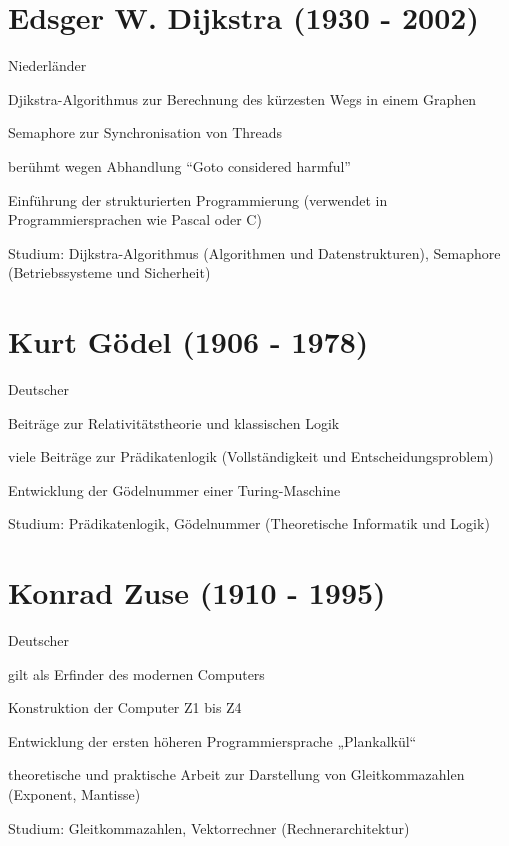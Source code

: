 \documentclass[a4paper,12pt]{report}
\begin{document}
\section*{Edsger W. Dijkstra (1930 - 2002)}
\begin{itemize*}
	\item Niederländer
	\item Djikstra-Algorithmus zur Berechnung des kürzesten Wegs in einem Graphen
	\item Semaphore zur Synchronisation von Threads
	\item berühmt wegen Abhandlung ``Goto considered harmful''
	\item Einführung der strukturierten Programmierung (verwendet in Programmiersprachen wie
	      Pascal oder C)
	\item Studium: Dijkstra-Algorithmus (Algorithmen und Datenstrukturen), Semaphore
	      (Betriebssysteme und Sicherheit)
\end{itemize*}

\section*{Kurt Gödel (1906 - 1978)}
\begin{itemize*}
	\item Deutscher
	\item Beiträge zur Relativitätstheorie und klassischen Logik
	\item viele Beiträge zur Prädikatenlogik (Vollständigkeit und Entscheidungsproblem)
  	\item Entwicklung der Gödelnummer einer Turing-Maschine
  	\item Studium: Prädikatenlogik, Gödelnummer (Theoretische Informatik und Logik)
\end{itemize*}

\section*{Konrad Zuse (1910 - 1995)}
\begin{itemize*}
	\item Deutscher
	\item gilt als Erfinder des modernen Computers
	\item Konstruktion der Computer Z1 bis Z4
	\item Entwicklung der ersten höheren Programmiersprache „Plankalkül“
	\item theoretische und praktische Arbeit zur Darstellung von Gleitkommazahlen (Exponent,
		  Mantisse)
	\item Studium: Gleitkommazahlen, Vektorrechner (Rechnerarchitektur)
\end{itemize*}
\end{document}
